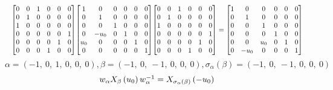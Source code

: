 \documentclass[11pt]{article}
\theoremstyle{definition}
\begin{document}
\[
\scaletoalign{\textwidth}{{\left[\begin{matrix}0 & 0 & 1 & 0 & 0 & 0\\0 & 1 & 0 & 0 & 0 & 0\\1 & 0 & 0 & 0 & 0 & 0\\0 & 0 & 0 & 0 & 0 & 1\\0 & 0 & 0 & 0 & 1 & 0\\0 & 0 & 0 & 1 & 0 & 0\end{matrix}\right]} {\left[\begin{matrix}1 & 0 & 0 & 0 & 0 & 0\\0 & 1 & 0 & 0 & 0 & 0\\0 & 0 & 1 & 0 & 0 & 0\\0 & - u_{0} & 0 & 1 & 0 & 0\\u_{0} & 0 & 0 & 0 & 1 & 0\\0 & 0 & 0 & 0 & 0 & 1\end{matrix}\right]} {\left[\begin{matrix}0 & 0 & 1 & 0 & 0 & 0\\0 & 1 & 0 & 0 & 0 & 0\\1 & 0 & 0 & 0 & 0 & 0\\0 & 0 & 0 & 0 & 0 & 1\\0 & 0 & 0 & 0 & 1 & 0\\0 & 0 & 0 & 1 & 0 & 0\end{matrix}\right]} = {\left[\begin{matrix}1 & 0 & 0 & 0 & 0 & 0\\0 & 1 & 0 & 0 & 0 & 0\\0 & 0 & 1 & 0 & 0 & 0\\0 & 0 & 0 & 1 & 0 & 0\\0 & 0 & u_{0} & 0 & 1 & 0\\0 & - u_{0} & 0 & 0 & 0 & 1\end{matrix}\right]}}
\]
\[
\alpha = \left( -1, \  0, \  1, \  0, \  0, \  0\right), \beta = \left( -1, \  0, \  -1, \  0, \  0, \  0\right), \sigma_{\alpha}(\beta) = \left( -1, \  0, \  -1, \  0, \  0, \  0\right)
\]
\[
\scaletoalign{\textwidth}{w_{\alpha} X_{\beta}\left(u_{0}\right) w_{\alpha}^{-1} = X_{\sigma_{\alpha}\left(\beta\right)}\left(- u_{0}\right)}
\]
\end{document}
